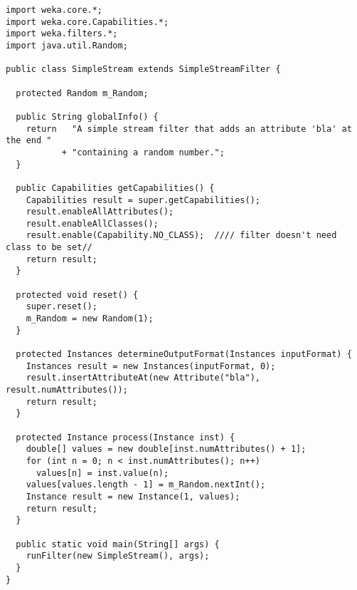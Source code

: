 
\begin{verbatim}
import weka.core.*;
import weka.core.Capabilities.*;
import weka.filters.*;
import java.util.Random;

public class SimpleStream extends SimpleStreamFilter {

  protected Random m_Random;

  public String globalInfo() {
    return   "A simple stream filter that adds an attribute 'bla' at the end "
           + "containing a random number.";
  }

  public Capabilities getCapabilities() {
    Capabilities result = super.getCapabilities();
    result.enableAllAttributes();
    result.enableAllClasses();
    result.enable(Capability.NO_CLASS);  //// filter doesn't need class to be set//
    return result;
  }

  protected void reset() {
    super.reset();
    m_Random = new Random(1);
  }

  protected Instances determineOutputFormat(Instances inputFormat) {
    Instances result = new Instances(inputFormat, 0);
    result.insertAttributeAt(new Attribute("bla"), result.numAttributes());
    return result;
  }

  protected Instance process(Instance inst) {
    double[] values = new double[inst.numAttributes() + 1];
    for (int n = 0; n < inst.numAttributes(); n++)
      values[n] = inst.value(n);
    values[values.length - 1] = m_Random.nextInt();
    Instance result = new Instance(1, values);
    return result;
  }

  public static void main(String[] args) {
    runFilter(new SimpleStream(), args);
  }
}
\end{verbatim}
